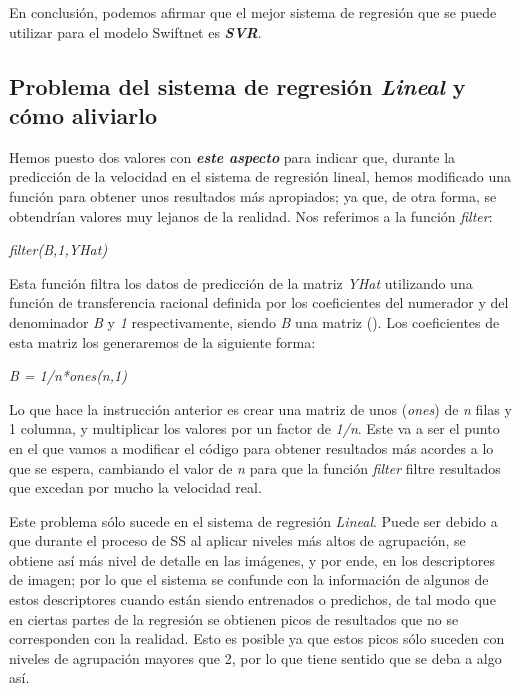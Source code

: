 En conclusión, podemos afirmar que el mejor sistema de regresión que se puede utilizar para el modelo Swiftnet es \textbf{\textit{\ac{SVR}}}.

\subsection{Problema del sistema de regresión \textit{Lineal} y cómo aliviarlo}

Hemos puesto dos valores con \textit{\textbf{este aspecto}} para indicar que, durante la predicción de la velocidad en el sistema de regresión lineal, hemos modificado una función para obtener unos resultados más apropiados; ya que, de otra forma, se obtendrían valores muy lejanos de la realidad. Nos referimos a la función \textit{filter}:

\begin{center}
\textit{filter(B,1,YHat)}
\end{center}

Esta función filtra los datos de predicción de la matriz \textit{YHat} utilizando una función de transferencia racional definida por los coeficientes del numerador y del denominador \textit{B} y \textit{1} respectivamente, siendo \textit{B} una matriz (\cite{filter}). Los coeficientes de esta matriz los generaremos de la siguiente forma:

\begin{center}
\textit{B = 1/n*ones(n,1)}
\end{center}

Lo que hace la instrucción anterior es crear una matriz de unos (\textit{ones}) de \textit{n} filas y 1 columna, y multiplicar los valores por un factor de \textit{1/n}. Este va a ser el punto en el que vamos a modificar el código para obtener resultados más acordes a lo que se espera, cambiando el valor de \textit{n} para que la función \textit{filter} filtre resultados que excedan por mucho la velocidad real.

Este problema sólo sucede en el sistema de regresión \textit{Lineal}. Puede ser debido a que durante el proceso de \ac{SS} al aplicar niveles más altos de agrupación, se obtiene así más nivel de detalle en las imágenes, y por ende, en los descriptores de imagen; por lo que el sistema se confunde con la información de algunos de estos descriptores cuando están siendo entrenados o predichos, de tal modo que en ciertas partes de la regresión se obtienen picos de resultados que no se corresponden con la realidad. Esto es posible ya que estos picos sólo suceden con niveles de agrupación mayores que 2, por lo que tiene sentido que se deba a algo así.

